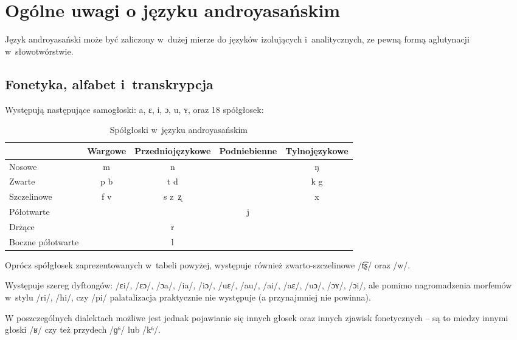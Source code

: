 \section[Ogólne uwagi]{Ogólne uwagi o języku androyasańskim}

\begin{spacing}{1.1}
Język androyasański może być zaliczony w~dużej mierze do języków 
izolujących i~analitycznych, ze pewną formą aglutynacji w~słowotwórstwie.

\subsection{Fonetyka, alfabet i~transkrypcja}

Występują następujące samogłoski: a, ɛ, i, ɔ, u, ʏ, oraz 18 spółgłosek:

\begin{table}[ht]
\centering
\caption{Spółgłoski w~języku androyasańskim}
\begin{tabular}{lcccc}\toprule
                  & Wargowe & Przedniojęzykowe & Podniebienne & Tylnojęzykowe \\\midrule
Nosowe            & m       & n                &              & ŋ             \\\midrule
Zwarte            & p b     & t d              &              & k g           \\\midrule
Szczelinowe       & f v     & s z~ʐ            &              & x             \\\midrule
Półotwarte        &         &                  & j            &               \\\midrule
Drżące            &         & r                &              &               \\\midrule
Boczne półotwarte &         & l                &              &               \\\bottomrule
\end{tabular}
\label{tab:consonants}
\end{table}

Oprócz spółgłosek zaprezentowanych w~tabeli powyżej, występuje 
również zwarto-szczelinowe /t͡ʂ/ oraz /w/.

Występuje szereg dyftongów: /ɛi/, /ɛɔ/, /ɔa/, /ia/, /iɔ/, /uɛ/, /au/, /ai/, 
/aɛ/, /uɔ/, /ɔʏ/, /ɔi/, ale pomimo nagromadzenia morfemów w~stylu /ri/, /hi/, 
czy /pi/ palatalizacja praktycznie nie występuje (a przynajmniej nie powinna).

W poszczególnych dialektach możliwe jest jednak pojawianie się innych głosek
oraz innych zjawisk fonetycznych -- są to miedzy innymi głoski /ʁ/ czy też
przydech /ɡʱ/ lub /kʱ/.


\end{spacing}

